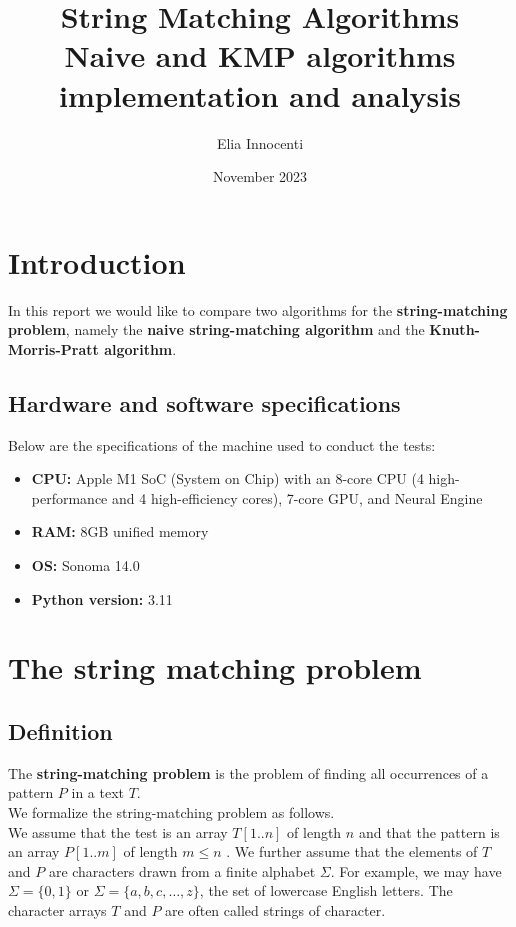 \documentclass[11pt]{article}
\title{String Matching Algorithms \\
       \vspace{0.5em}
       \large Naive and KMP algorithms implementation and analysis}
\author{Elia Innocenti}
\date{November 2023}
\begin{document}
    \maketitle
    \tableofcontents

    \newpage

    \section{Introduction} \label{sec:introduction}

        In this report we would like to compare two algorithms for the \textbf{string-matching problem}, namely the \textbf{naive string-matching algorithm} and the \textbf{Knuth-Morris-Pratt algorithm}.

        \subsection{Hardware and software specifications} \label{subsec:hardware_software}

        Below are the specifications of the machine used to conduct the tests:
        \begin{itemize}
            \item \textbf{CPU:} Apple M1 SoC (System on Chip) with an 8-core CPU (4 high-performance and 4 high-efficiency cores), 7-core GPU, and Neural Engine
            \item \textbf{RAM:} 8GB unified memory
            \item \textbf{OS:} Sonoma 14.0
            \item \textbf{Python version:} 3.11
        \end{itemize}

    \section{The string matching problem} \label{sec:string_matching_problem}

        \subsection{Definition} \label{subsec:definition}

        The \textbf{string-matching problem} is the problem of finding all occurrences of a pattern $P$ in a text $T$. \\

        We formalize the string-matching problem as follows. \\
        We assume that the test is an array $T[1..n]$ of length $n$ and that the pattern is an array $P[1..m]$ of length $m \leq n$ .
        We further assume that the elements of $T$ and $P$ are characters drawn from a finite alphabet $\Sigma$.
        For example, we may have $\Sigma = \{0, 1\}$ or $\Sigma = \{a, b, c, \dots, z\}$, the set of lowercase English letters.
        The character arrays $T$ and $P$ are often called strings of character. \\
\end{document}
